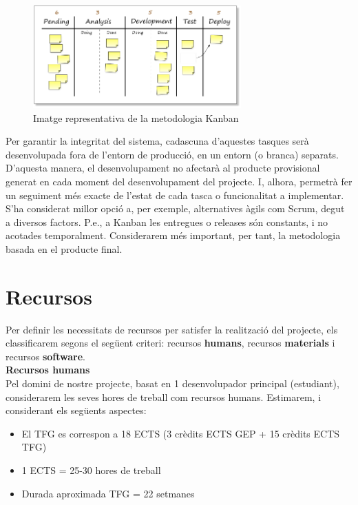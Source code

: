 \begin{figure}
\centering
\includegraphics[width=8cm]{Figures/Figure3}
\decoRule
\caption[Imatge representativa de la metodologia Kanban]{Imatge representativa de la metodologia Kanban}
\label{fig:Figura3}
\end{figure}

Per garantir la integritat del sistema, cadascuna d’aquestes tasques serà desenvolupada fora de l’entorn de producció, en un entorn (o branca) separats. D’aquesta manera, el desenvolupament no afectarà al producte provisional generat en cada moment del desenvolupament del projecte. I, alhora, permetrà fer un seguiment més exacte de l’estat de cada tasca o funcionalitat a implementar. \\

S’ha considerat millor opció a, per exemple, alternatives àgils com Scrum, degut a diversos factors. P.e., a Kanban les entregues o releases són constants, i no acotades temporalment. Considerarem més important, per tant, la metodologia basada en el producte final. \\

\section{Recursos}

Per definir les necessitats de recursos per satisfer la realització del projecte, els classificarem segons el següent criteri: recursos \textbf{humans}, recursos \textbf{materials} i recursos \textbf{software}.\\

\noindent \textbf{\large Recursos humans}\\

\noindent Pel domini de nostre projecte, basat en 1 desenvolupador principal (estudiant), considerarem les seves hores de treball com recursos humans. Estimarem, i considerant els següents aspectes:

\begin{itemize}
\item El TFG es correspon a 18 ECTS (3 crèdits ECTS GEP + 15 crèdits ECTS TFG)
\item 1 ECTS = 25-30 hores de treball
\item Durada aproximada TFG = 22 setmanes
\end{itemize}

